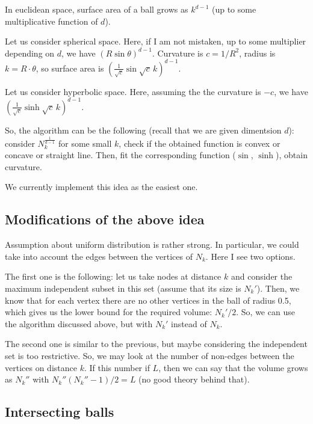 \documentclass{article}
\begin{document}
In euclidean space, surface area of a ball grows as $k^{d-1}$ (up to some multiplicative function of $d$). 

Let us consider spherical space. Here, if I am not mistaken, up to some multiplier depending on $d$, we have  $\left(R \sin \theta\right)^{d-1}$. Curvature is $c = 1/R^2$, radius is $k = R \cdot \theta$, so surface area is $\left(\frac{1}{\sqrt{c}}\sin{\sqrt{c}\,k}\right)^{d-1}$.

Let us consider hyperbolic space. Here, assuming the the curvature is $-c$, we have $\left(\frac{1}{\sqrt{c}}\sinh{\sqrt{c}\,k}\right)^{d-1}$.

So, the algorithm can be the following (recall that we are given dimentsion $d$): consider $N_k^{\frac 1 {d-1}}$ for some small $k$, check if the obtained function is convex or concave or straight line. Then, fit the corresponding function ($\sin$, $\sinh$), obtain curvature.

We currently implement this idea as the easiest one.

\subsection{Modifications of the above idea}

Assumption about uniform distribution is rather strong. In particular, we could take into account the edges between the vertices of $N_k$. Here I see two options.

The first one is the following: let us take nodes at distance $k$ and consider the maximum independent subset in this set (assume that its size is $N_k'$). Then, we know that for each vertex there are no other vertices in the ball of radius 0.5, which gives us the lower bound for the required volume: $N_k'/2$. So, we can use the algorithm discussed above, but with $N_k'$ instead of $N_k$.

The second one is similar to the previous, but maybe considering the independent set is too restrictive. So, we may look at the number of non-edges between the vertices on distance $k$. If this number if $L$, then we can say that the volume grows as $N_k''$ with $N_k''(N_k''-1)/2 = L$ (no good theory behind that).

\subsection{Intersecting balls}
\end{document}
